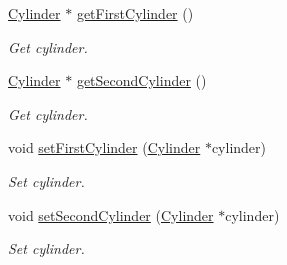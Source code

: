 {\bf }\par
\begin{DoxyCompactItemize}
\item 
\hyperlink{classCylinder}{Cylinder} $\ast$ \hyperlink{classMotorGhost_a053864275b9a1badfe7f64bb41b024c0}{get\+First\+Cylinder} ()
\begin{DoxyCompactList}\small\item\em Get cylinder. \end{DoxyCompactList}\item 
\hyperlink{classCylinder}{Cylinder} $\ast$ \hyperlink{classMotorGhost_a0f9c7b8208d450277232df422cc96f2e}{get\+Second\+Cylinder} ()
\begin{DoxyCompactList}\small\item\em Get cylinder. \end{DoxyCompactList}\end{DoxyCompactItemize}

{\bf }\par
\begin{DoxyCompactItemize}
\item 
void \hyperlink{classMotorGhost_a61d840da18fe5a3a014694ae61b6feb6}{set\+First\+Cylinder} (\hyperlink{classCylinder}{Cylinder} $\ast$cylinder)
\begin{DoxyCompactList}\small\item\em Set cylinder. \end{DoxyCompactList}\item 
void \hyperlink{classMotorGhost_a37eb6c3fd66f16999b8c84e1d1f3e758}{set\+Second\+Cylinder} (\hyperlink{classCylinder}{Cylinder} $\ast$cylinder)
\begin{DoxyCompactList}\small\item\em Set cylinder. \end{DoxyCompactList}\end{DoxyCompactItemize}

